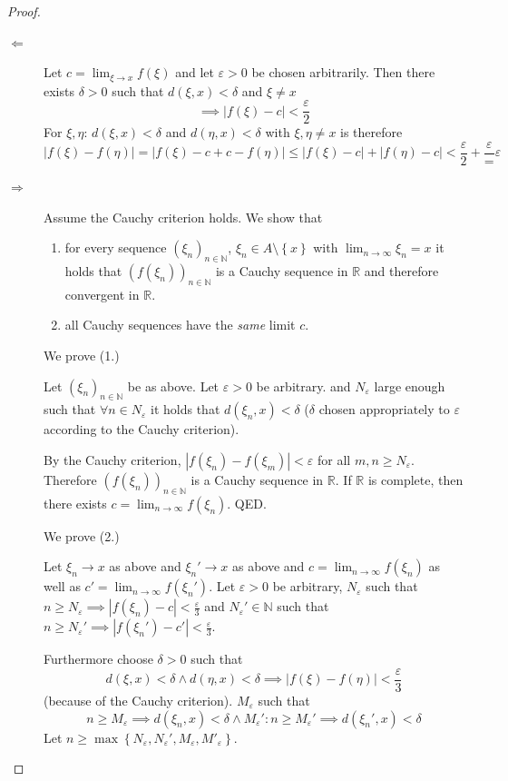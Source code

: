 \documentclass{article}
\newcommand{\set}[1]{\left\{#1\right\}}
\newcommand{\card}[1]{\left|#1\right|}
\begin{document}
\begin{proof}
  \begin{description}
    \item[$\Leftarrow$] 
      Let $c = \lim_{\xi\to x} f(\xi)$ and let $\varepsilon > 0$ be chosen arbitrarily.
      Then there exists $\delta > 0$ such that $d(\xi,x) < \delta$ and $\xi \neq x$
      \[ \implies \card{f(\xi) - c} < \frac\varepsilon2 \]
      For $\xi, \eta$: $d(\xi, x) < \delta$ and $d(\eta, x) < \delta$ with $\xi, \eta \neq x$
      is therefore
      \[ \card{f(\xi) - f(\eta)} = \card{f(\xi) - c + c - f(\eta)} \leq \card{f(\xi) - c} + \card{f(\eta) - c} < \frac\varepsilon2 + \frac\varepsilon = \varepsilon \]
    \item[$\Rightarrow$]
      Assume the Cauchy criterion holds. We show that
      \begin{enumerate}
        \item for every sequence $(\xi_n)_{n\in\mathbb N}$, $\xi_n \in A \setminus \set{x}$ with $\lim_{n\to\infty} \xi_n = x$ it holds that
        $(f(\xi_n))_{n\in\mathbb N}$ is a Cauchy sequence in $\mathbb R$ and therefore convergent in $\mathbb R$.
        \item all Cauchy sequences have the \emph{same} limit $c$.
      \end{enumerate}
      We prove (1.)

      Let $(\xi_n)_{n\in\mathbb N}$ be as above. Let $\varepsilon > 0$ be arbitrary.
      and $N_{\varepsilon}$ large enough such that $\forall n \in N_{\varepsilon}$ it holds that
      $d(\xi_n, x) < \delta$ ($\delta$ chosen appropriately to $\varepsilon$ according to the Cauchy criterion).

      By the Cauchy criterion, $\card{f(\xi_n) - f(\xi_m)} < \varepsilon$ for all $m,n \geq N_{\varepsilon}$.
      Therefore $(f(\xi_n))_{n\in\mathbb N}$ is a Cauchy sequence in $\mathbb R$.
      If $\mathbb R$ is complete, then there exists $c = \lim_{n\to\infty} f(\xi_n)$. QED.

      We prove (2.)

      Let $\xi_n \to x$ as above and $\xi_n' \to x$ as above and $c = \lim_{n\to\infty} f(\xi_n)$ as well as $c' = \lim_{n\to\infty} f(\xi_n')$. Let $\varepsilon > 0$ be arbitrary, $N_{\varepsilon}$ such that $n \geq N_{\varepsilon} \implies \card{f(\xi_n) - c} < \frac{\varepsilon}{3}$ and $N_{\varepsilon}' \in \mathbb N$ such that $n \geq N_{\varepsilon}' \implies \card{f(\xi_n') - c'} < \frac\varepsilon3$.

      Furthermore choose $\delta > 0$ such that
      \[ d(\xi, x) < \delta \land d(\eta, x) < \delta \implies \card{f(\xi) - f(\eta)} < \frac{\varepsilon}{3} \]
      (because of the Cauchy criterion).
      $M_{\varepsilon}$ such that 
      \[ n \geq M_{\varepsilon} \implies d(\xi_n, x) < \delta \land M_{\varepsilon}': n \geq M_{\varepsilon}' \implies d(\xi_n', x) < \delta \]
      Let $n \geq \max\set{N_{\varepsilon}, N_{\varepsilon}', M_{\varepsilon}, M'_{\varepsilon}}$.


\end{description}
\end{proof}
\end{document}
